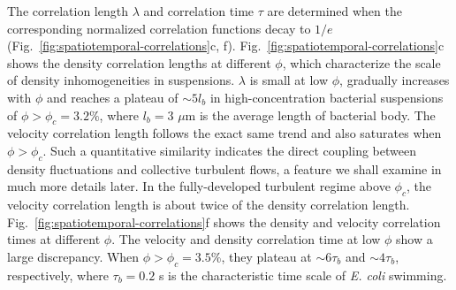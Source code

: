 The correlation length $\lambda$ and correlation time $\tau$ are determined when the corresponding normalized correlation functions decay to $1/e$ (Fig.~\ref{fig:spatiotemporal-correlations}c, f). Fig.~\ref{fig:spatiotemporal-correlations}c shows the density correlation lengths at different $\phi$, which characterize the scale of density inhomogeneities in suspensions.
$\lambda$ is small at low $\phi$, gradually increases with $\phi$ and reaches a plateau of $\sim 5l_b$ in high-concentration bacterial suspensions of $\phi > \phi_c = 3.2\%$, where $l_b=3$ $\mu$m is the average length of bacterial body. The velocity correlation length follows the exact same trend and also saturates when $\phi > \phi_c$. Such a quantitative similarity indicates the direct coupling between density fluctuations and collective turbulent flows, a feature we shall examine in much more details later. In the fully-developed turbulent regime above $\phi_c$, the velocity correlation length is about twice of the density correlation length.
Fig.~\ref{fig:spatiotemporal-correlations}f shows the density and velocity correlation times at different $\phi$. The velocity and density correlation time at low $\phi$ show a large discrepancy. When $\phi > \phi_c=3.5\%$, they plateau at $\sim 6\tau_b$ and $\sim 4\tau_b$, respectively, where $\tau_b=0.2$ s is the characteristic time scale of \textit{E. coli} swimming.


